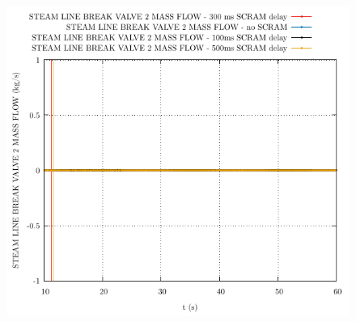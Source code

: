 \documentclass{article}
\begin{document}
\begin{multicols}{2}
\begin{figure}[H]
\end{figure}
\begin{figure}[H]
\centering
\includegraphics[width=\columnwidth]{./graphs/STEAM LINE BREAK VALVE 2 MASS FLOW_comp.pdf}
\end{figure}
\end{multicols}
\end{document}
